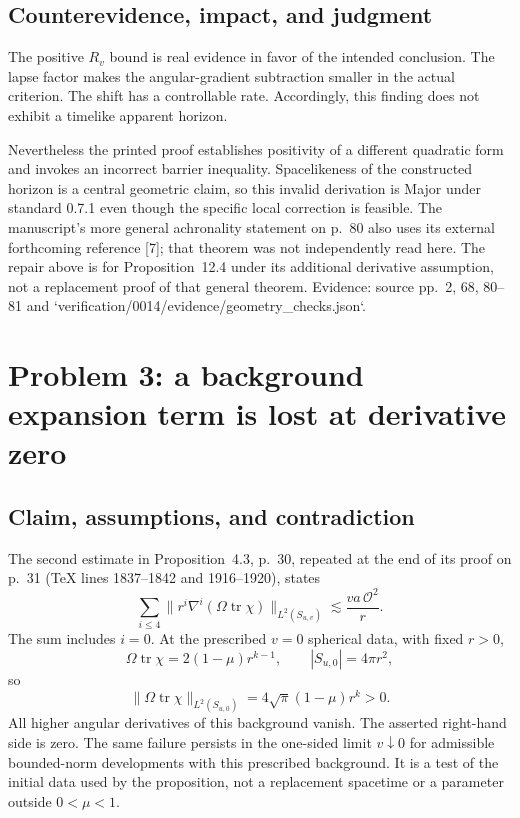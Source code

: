 \documentclass[10pt]{article}
\begin{document}
\subsection*{Counterevidence, impact, and judgment}
The positive \(R_v\) bound is real evidence in favor of the intended conclusion. The lapse factor makes the angular-gradient subtraction smaller in the actual criterion. The shift has a controllable rate. Accordingly, this finding does not exhibit a timelike apparent horizon.\par
Nevertheless the printed proof establishes positivity of a different quadratic form and invokes an incorrect barrier inequality. Spacelikeness of the constructed horizon is a central geometric claim, so this invalid derivation is Major under standard 0.7.1 even though the specific local correction is feasible. The manuscript’s more general achronality statement on p. 80 also uses its external forthcoming reference [7]; that theorem was not independently read here. The repair above is for Proposition 12.4 under its additional derivative assumption, not a replacement proof of that general theorem. Evidence: source pp. 2, 68, 80–81 and `verification/0014/evidence/geometry\_checks.json`.\par
\section*{Problem 3: a background expansion term is lost at derivative zero}
\subsection*{Claim, assumptions, and contradiction}
The second estimate in Proposition 4.3, p. 30, repeated at the end of its proof on p. 31 (TeX lines 1837–1842 and 1916–1920), states \[\sum_{i\le4}\|r^i\nabla^i(\Omega\operatorname{tr}\chi)\|_{L^2(S_{u,v})}
 \lesssim \frac{va\,\mathcal O^2}{r}.\] The sum includes \(i=0\). At the prescribed \(v=0\) spherical data, with fixed \(r>0\), \[\Omega\operatorname{tr}\chi=2(1-\mu)r^{k-1},\qquad
 |S_{u,0}|=4\pi r^2,\] so \[\|\Omega\operatorname{tr}\chi\|_{L^2(S_{u,0})}
 =4\sqrt\pi(1-\mu)r^k>0.\] All higher angular derivatives of this background vanish. The asserted right-hand side is zero. The same failure persists in the one-sided limit \(v\downarrow0\) for admissible bounded-norm developments with this prescribed background. It is a test of the initial data used by the proposition, not a replacement spacetime or a parameter outside \(0<\mu<1\).\par
\end{document}
